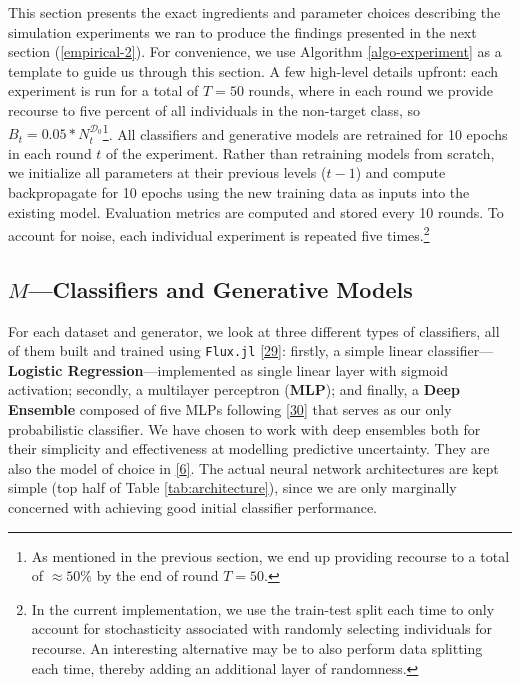 \documentclass[conference,final,]{IEEEtran}
\theoremstyle{definition}
\theoremstyle{definition}
\theoremstyle{definition}
\theoremstyle{definition}
\theoremstyle{remark}
\begin{document}
This section presents the exact ingredients and parameter choices describing the simulation experiments we ran to produce the findings presented in the next section (\ref{empirical-2}). For convenience, we use Algorithm \ref{algo-experiment} as a template to guide us through this section. A few high-level details upfront: each experiment is run for a total of \(T=50\) rounds, where in each round we provide recourse to five percent of all individuals in the non-target class, so \(B_t=0.05 * N_t^{\mathcal{D}_0}\)\footnote{As mentioned in the previous section, we end up providing recourse to a total of \(\approx50\%\) by the end of round \(T=50\).}. All classifiers and generative models are retrained for 10 epochs in each round \(t\) of the experiment. Rather than retraining models from scratch, we initialize all parameters at their previous levels (\(t-1\)) and compute backpropagate for 10 epochs using the new training data as inputs into the existing model. Evaluation metrics are computed and stored every 10 rounds. To account for noise, each individual experiment is repeated five times.\footnote{In the current implementation, we use the train-test split each time to only account for stochasticity associated with randomly selecting individuals for recourse. An interesting alternative may be to also perform data splitting each time, thereby adding an additional layer of randomness.}

\hypertarget{empirical-classifiers}{%
\subsection{\texorpdfstring{\(M\)---Classifiers and Generative Models}{M---Classifiers and Generative Models}}\label{empirical-classifiers}}

For each dataset and generator, we look at three different types of classifiers, all of them built and trained using \texttt{Flux.jl} \protect\hyperlink{ref-innes2018fashionable}{{[}29{]}}: firstly, a simple linear classifier---\textbf{Logistic Regression}---implemented as single linear layer with sigmoid activation; secondly, a multilayer perceptron (\textbf{MLP}); and finally, a \textbf{Deep Ensemble} composed of five MLPs following \protect\hyperlink{ref-lakshminarayanan2016simple}{{[}30{]}} that serves as our only probabilistic classifier. We have chosen to work with deep ensembles both for their simplicity and effectiveness at modelling predictive uncertainty. They are also the model of choice in \protect\hyperlink{ref-schut2021generating}{{[}6{]}}. The actual neural network architectures are kept simple (top half of Table \ref{tab:architecture}), since we are only marginally concerned with achieving good initial classifier performance.
\end{document}
